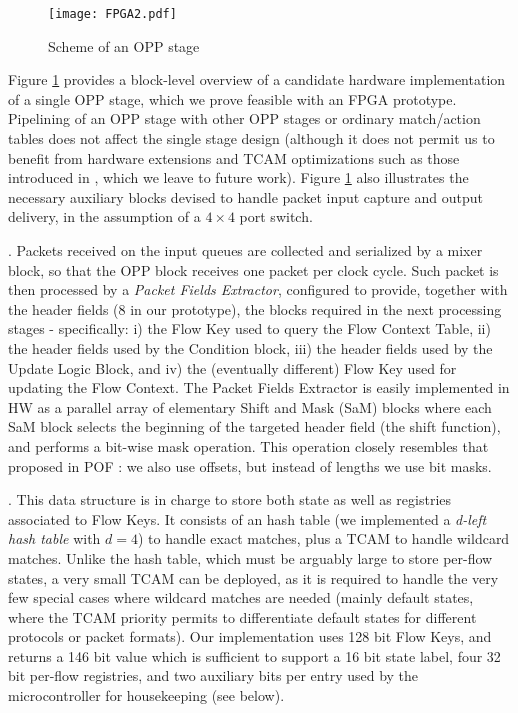 \documentclass{sig-alternate}
\begin{document}
\begin{figure}[t]
\centering
   \texttt{[image: FPGA2.pdf]}
   	  \vspace{-2em}
\caption{Scheme of an OPP stage}
	  \vspace{-1.3em}
\label{F:HW_core}
\end{figure}



Figure \ref{F:HW_core} provides a block-level overview of a candidate hardware implementation of a single OPP stage, which we prove feasible with an FPGA prototype. Pipelining of an OPP stage with other OPP stages or ordinary match/action tables does not affect the single stage design (although it does not permit us to benefit from hardware extensions and TCAM optimizations such as those introduced in \cite{Bos13}, which we leave to future work). Figure \ref{F:HW_core} also illustrates the necessary auxiliary blocks devised to handle packet input capture and output delivery, in the assumption of a $4 \times 4$ port switch.


\vspace{3pt} .
Packets received on the input queues are collected and serialized by a mixer block, so that the OPP block receives one packet per clock cycle. Such packet is then processed by a {\em Packet Fields Extractor}, configured to provide, together  with the header fields (8 in our prototype), the blocks required in the next processing stages - specifically: i) the Flow Key used to query the Flow Context Table, ii) the header fields used by the Condition block, iii) the header fields used by the Update Logic Block, and iv) the (eventually different) Flow Key used for updating the Flow Context. The Packet Fields Extractor is easily implemented in HW as a parallel array of elementary Shift and Mask (SaM) blocks where each SaM block selects the beginning of the targeted header field (the shift function), and performs a bit-wise mask operation. This operation closely resembles that proposed in POF \cite{Son13}: we also use offsets, but instead of lengths we use bit masks.  

\vspace{3pt} . This data structure is in charge to store both state as well as registries associated to Flow Keys. It consists of an hash table (we implemented a  {\em d-left hash table} with $d=4$) to handle exact matches, plus a TCAM to handle wildcard matches. Unlike the hash table, which must be arguably large to store per-flow states, a very small TCAM can be deployed, as it is required to handle the very few special cases where wildcard matches are needed (mainly default states, where the TCAM priority permits to differentiate default states for different protocols or packet formats). Our implementation uses 128 bit Flow Keys, and returns a 146 bit value which is sufficient to support a 16 bit state label, four 32 bit per-flow registries, and two auxiliary bits per entry used by the microcontroller for housekeeping (see below). 
\end{document}
